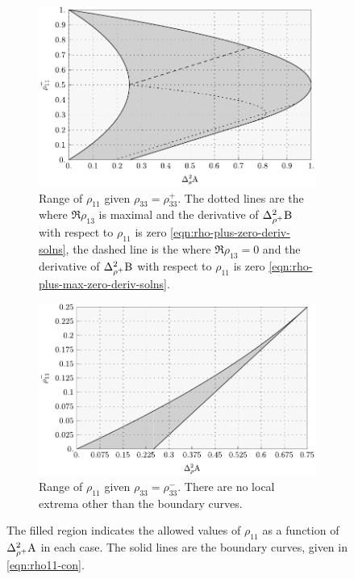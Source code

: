 \begin{subappendices}
\begin{figure}[ht]
\begin{subfigure}[t]{0.4\textwidth}
    \includegraphics[height=0.65\linewidth]{figs/qutrit-rhoplus-r11vals}
    \caption[Range of $\rho_{11}$ given $\rho_{33} = \rho_{33}^+$]{Range of $\rho_{11}$ given $\rho_{33} = \rho_{33}^+$. The dotted lines are the where $\Re{\rho_{13}}$ is maximal and the derivative of $\var[\rho^+]{\opb}$ with respect to $\rho_{11}$ is zero \eqref{eqn:rho-plus-zero-deriv-solns}, the dashed line is the where $\Re{\rho_{13}} = 0$ and the derivative of $\var[\rho^+]{\opb}$ with respect to $\rho_{11}$ is zero \eqref{eqn:rho-plus-max-zero-deriv-solns}.}\label{fig:rho-plus-vals}
  \end{subfigure}\quad
  \begin{subfigure}[t]{0.4\textwidth}
    \includegraphics[height=0.65\linewidth]{figs/qutrit-rhominus-r11vals}
    \caption[Range of $\rho_{11}$ given $\rho_{33} = \rho_{33}^-$]{Range of $\rho_{11}$ given $\rho_{33} = \rho_{33}^-$. There are no local extrema other than the boundary curves.}\label{fig:rho-minus-vals}
  \end{subfigure}
  \caption[Allowed values of $\rho_{11}$ in the minimizing states for the Gell-Mann pair]{The filled region indicates the allowed values of $\rho_{11}$ as a function of $\var[\rho^+]{\opa}$ in each case. The solid lines are the boundary curves, given in  {\eqref{eqn:rho11-con}}.}
\end{figure}


\end{subappendices}
